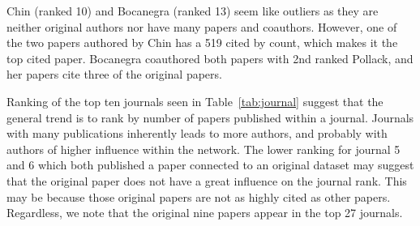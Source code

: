 Chin (ranked 10) and Bocanegra (ranked 13) seem like outliers as they are neither original authors nor have many papers and coauthors. However, one of the two papers authored by Chin has a 519 cited by count, which makes it the top cited paper. Bocanegra coauthored both papers with 2nd ranked Pollack, and her papers cite three of the original papers.

    \begin{table}[h]
    \caption{Top Authors by Multirank}
    \label{tab:multi}
    \end{table}

Ranking of the top ten journals seen in Table~\ref{tab:journal} suggest that the general trend is to rank by number of papers published within a journal. Journals with many publications inherently leads to more authors, and probably with authors of higher influence within the network. The lower ranking for journal 5 and 6 which both published a paper connected to an original dataset may suggest that the original paper does not have a great influence on the journal rank. This may be because those original papers are not as highly cited as other papers. Regardless, we note that the original nine papers appear in the top 27 journals.

